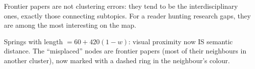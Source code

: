 \documentclass[11pt,a4paper]{article}
\begin{document}
\begin{ojo}
Frontier papers are not clustering errors: they tend to be the interdisciplinary ones, exactly
those connecting subtopics. For a reader hunting research gaps, they are among the most
interesting on the map.
\end{ojo}

\begin{resumen}
Springs with length $= 60 + 420(1-w)$: visual proximity now IS semantic distance. The
``misplaced'' nodes are frontier papers (most of their neighbours in another cluster), now
marked with a dashed ring in the neighbour's colour.
\end{resumen}
\end{document}
